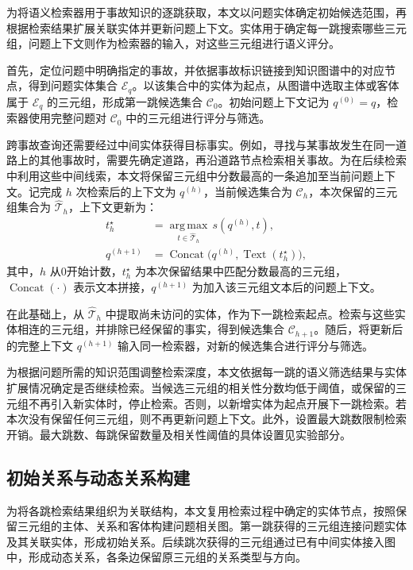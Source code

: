 为将语义检索器用于事故知识的逐跳获取，本文以问题实体确定初始候选范围，再根据检索结果扩展关联实体并更新问题上下文。实体用于确定每一跳搜索哪些三元组，问题上下文则作为检索器的输入，对这些三元组进行语义评分。

首先，定位问题中明确指定的事故，并依据事故标识链接到知识图谱中的对应节点，得到问题实体集合 $\mathcal{E}_q$。以该集合中的实体为起点，从图谱中选取主体或客体属于 $\mathcal{E}_q$ 的三元组，形成第一跳候选集合 $\mathcal{C}_0$。初始问题上下文记为 $q^{(0)}=q$，检索器使用完整问题对 $\mathcal{C}_0$ 中的三元组进行评分与筛选。

跨事故查询还需要经过中间实体获得目标事实。例如，寻找与某事故发生在同一道路上的其他事故时，需要先确定道路，再沿道路节点检索相关事故。为在后续检索中利用这些中间线索，本文将保留三元组中分数最高的一条追加至当前问题上下文。记完成 $h$ 次检索后的上下文为 $q^{(h)}$，当前候选集合为 $\mathcal{C}_h$，本次保留的三元组集合为 $\widehat{\mathcal{T}}_h$，上下文更新为：
\begin{equation}
\begin{aligned}
t_h^\star&=\underset{t\in\widehat{\mathcal{T}}_h}{\operatorname{arg\,max}}\,s(q^{(h)},t),\\
q^{(h+1)}&=\operatorname{Concat}\bigl(q^{(h)},\operatorname{Text}(t_h^\star)\bigr),
\end{aligned}
\end{equation}
其中，$h$ 从0开始计数，$t_h^\star$ 为本次保留结果中匹配分数最高的三元组，$\operatorname{Concat}(\cdot)$ 表示文本拼接，$q^{(h+1)}$ 为加入该三元组文本后的问题上下文。

在此基础上，从 $\widehat{\mathcal{T}}_h$ 中提取尚未访问的实体，作为下一跳检索起点。检索与这些实体相连的三元组，并排除已经保留的事实，得到候选集合 $\mathcal{C}_{h+1}$。随后，将更新后的完整上下文 $q^{(h+1)}$ 输入同一检索器，对新的候选集合进行评分与筛选。

为根据问题所需的知识范围调整检索深度，本文依据每一跳的语义筛选结果与实体扩展情况确定是否继续检索。当候选三元组的相关性分数均低于阈值，或保留的三元组不再引入新实体时，停止检索。否则，以新增实体为起点开展下一跳检索。若本次没有保留任何三元组，则不再更新问题上下文。此外，设置最大跳数限制检索开销。最大跳数、每跳保留数量及相关性阈值的具体设置见实验部分。

\subsection{初始关系与动态关系构建}

为将各跳检索结果组织为关联结构，本文复用检索过程中确定的实体节点，按照保留三元组的主体、关系和客体构建问题相关图。第一跳获得的三元组连接问题实体及其关联实体，形成初始关系。后续跳次获得的三元组通过已有中间实体接入图中，形成动态关系，各条边保留原三元组的关系类型与方向。

